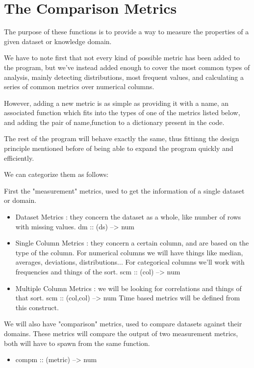 \section{The Comparison Metrics}
\label{cap2:sec:metrics}

The purpose of these functions is to provide a way to measure the properties of a given dataset or knowledge domain.

We have to note first that not every kind of possible metric has been added to the program, but we've instead added enough to cover the most common types of analysis, mainly detecting distributions, most frequent values, and calculating a series of common metrics over numerical columns.

However, adding a new metric is as simple as providing it with a name, an associated function which fits into the types of one of the metrics listed below, and adding the pair of name,function to a dictionary present in the code.

The rest of the program will behave exactly the same, thus fittinng the design principle mentioned before of being able to expand the program quickly and efficiently.

We can categorize them as follows:

First the "measurement" metrics, used to get the information of a single dataset or domain.
\begin{itemize}
\item Dataset Metrics : they concern the dataset as a whole, like number of rows with missing values.
    dm :: (ds) --> num
    
\item Single Column Metrics : they concern a certain column, and are based on the type of the column.
    For numerical columns we will have things like median, averages, deviations, distributions...
    For categorical columns we'll work with frequencies and things of the sort.
    scm :: (col) --> num
    
\item Multiple Column Metrics : we will be looking for correlations and things of that sort.
    scm :: (col,col) --> num 
    Time based metrics will be defined from this construct.
\end{itemize}

We will also have "comparison" metrics, used to compare datasets against their domains.
These metrics will compare the output of two measurement metrics, both will have to
spawn from the same function.
\begin{itemize}
\item compm :: (metric) --> num
\end{itemize}

